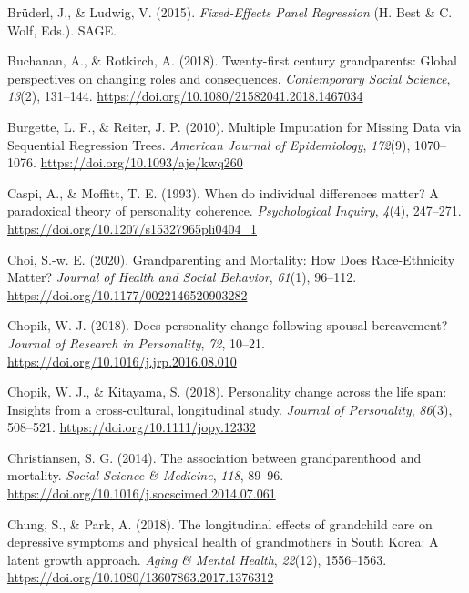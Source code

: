 \documentclass[
  english,
  man, noextraspace,floatsintext]{apa7}
\begin{document}
\leavevmode\hypertarget{ref-bruderlFixedEffectsPanelRegression2015}{}%
Brüderl, J., \& Ludwig, V. (2015). \emph{Fixed-Effects Panel Regression} (H. Best \& C. Wolf, Eds.). SAGE.

\leavevmode\hypertarget{ref-buchananTwentyfirstCenturyGrandparents2018}{}%
Buchanan, A., \& Rotkirch, A. (2018). Twenty-first century grandparents: Global perspectives on changing roles and consequences. \emph{Contemporary Social Science}, \emph{13}(2), 131--144. \url{https://doi.org/10.1080/21582041.2018.1467034}

\leavevmode\hypertarget{ref-burgetteMultipleImputationMissing2010}{}%
Burgette, L. F., \& Reiter, J. P. (2010). Multiple Imputation for Missing Data via Sequential Regression Trees. \emph{American Journal of Epidemiology}, \emph{172}(9), 1070--1076. \url{https://doi.org/10.1093/aje/kwq260}

\leavevmode\hypertarget{ref-caspiWhenIndividualDifferences1993}{}%
Caspi, A., \& Moffitt, T. E. (1993). When do individual differences matter? A paradoxical theory of personality coherence. \emph{Psychological Inquiry}, \emph{4}(4), 247--271. \url{https://doi.org/10.1207/s15327965pli0404_1}

\leavevmode\hypertarget{ref-choiGrandparentingMortalityHow2020}{}%
Choi, S.-w. E. (2020). Grandparenting and Mortality: How Does Race-Ethnicity Matter? \emph{Journal of Health and Social Behavior}, \emph{61}(1), 96--112. \url{https://doi.org/10.1177/0022146520903282}

\leavevmode\hypertarget{ref-chopikDoesPersonalityChange2018}{}%
Chopik, W. J. (2018). Does personality change following spousal bereavement? \emph{Journal of Research in Personality}, \emph{72}, 10--21. \url{https://doi.org/10.1016/j.jrp.2016.08.010}

\leavevmode\hypertarget{ref-chopikPersonalityChangeLife2018}{}%
Chopik, W. J., \& Kitayama, S. (2018). Personality change across the life span: Insights from a cross-cultural, longitudinal study. \emph{Journal of Personality}, \emph{86}(3), 508--521. \url{https://doi.org/10.1111/jopy.12332}

\leavevmode\hypertarget{ref-christiansenAssociationGrandparenthoodMortality2014}{}%
Christiansen, S. G. (2014). The association between grandparenthood and mortality. \emph{Social Science \& Medicine}, \emph{118}, 89--96. \url{https://doi.org/10.1016/j.socscimed.2014.07.061}

\leavevmode\hypertarget{ref-chungLongitudinalEffectsGrandchild2018}{}%
Chung, S., \& Park, A. (2018). The longitudinal effects of grandchild care on depressive symptoms and physical health of grandmothers in South Korea: A latent growth approach. \emph{Aging \& Mental Health}, \emph{22}(12), 1556--1563. \url{https://doi.org/10.1080/13607863.2017.1376312}
\end{document}
